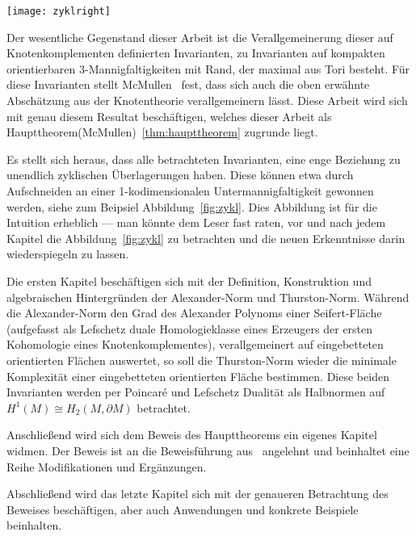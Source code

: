 	\hfill
	\begin{minipage}[t]{0.2\textwidth}
	\vfill \begin{flushright}
		\texttt{[image: zyklright]} 
	\end{flushright}
	\end{minipage}
    
	Der wesentliche Gegenstand dieser Arbeit ist die Verallgemeinerung dieser auf Knotenkomplementen definierten Invarianten, zu Invarianten auf kompakten orientierbaren 3-Mannigfaltigkeiten mit Rand, der maximal aus Tori besteht. Für diese Invarianten stellt McMullen~\cite{MCMULLEN.2002} fest, dass sich auch die oben erwähnte Abschätzung aus der Knotentheorie verallgemeinern lässt. Diese Arbeit wird sich mit genau diesem Resultat beschäftigen, welches dieser Arbeit als Haupttheorem(McMullen)~\ref{thm:haupttheorem} zugrunde liegt.

    Es stellt sich heraus, dass alle betrachteten Invarianten, eine enge Beziehung zu unendlich zyklischen Überlagerungen haben. Diese können etwa durch Aufschneiden an einer 1-kodimensionalen Untermannigfaltigkeit gewonnen werden, siehe zum Beipsiel Abbildung~\ref{fig:zykl}. Dies Abbildung ist für die Intuition erheblich --- man könnte dem Leser fast raten, vor und nach jedem Kapitel die Abbildung~\ref{fig:zykl} zu betrachten und die neuen Erkenntnisse darin wiederspiegeln zu lassen.

	Die ersten Kapitel beschäftigen sich mit der Definition, Konstruktion und algebraischen Hintergründen der Alexander-Norm und Thurston-Norm. Während die Alexander-Norm den Grad des Alexander Polynoms einer Seifert-Fläche (aufgefasst als Lefschetz duale Homologieklasse eines Erzeugers der ersten Kohomologie eines Knotenkomplementes), verallgemeinert auf eingebetteten orientierten Flächen auswertet, so soll die Thurston-Norm wieder die minimale Komplexität einer eingebetteten orientierten Fläche bestimmen. Diese beiden Invarianten werden per Poincaré und Lefschetz Dualität als Halbnormen auf $H^1(M) \cong H_2(M,\partial M)$ betrachtet.

	Anschließend wird sich dem Beweis des Haupttheorems ein eigenes Kapitel widmen. Der Beweis ist an die Beweisführung aus~\cite{MCMULLEN.2002} angelehnt und beinhaltet eine Reihe Modifikationen und Ergänzungen. 

	Abschließend wird das letzte Kapitel sich mit der genaueren Betrachtung des Beweises beschäftigen, aber auch Anwendungen und konkrete Beispiele beinhalten.

